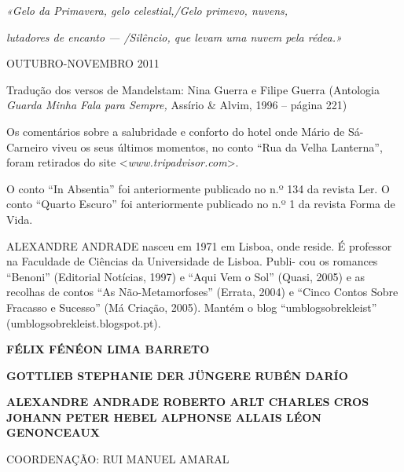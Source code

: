 \emph{«Gelo da Primavera, gelo celestial,/Gelo primevo, nuvens,}

\emph{lutadores de encanto --- /Silêncio, que levam uma nuvem pela
rédea.»}

OUTUBRO-NOVEMBRO 2011

Tradução dos versos de Mandelstam: Nina Guerra e Filipe Guerra
(Antologia \emph{Guarda Minha Fala para Sempre, }Assírio \& Alvim, 1996
-- página 221)

Os comentários sobre a salubridade e conforto do hotel onde Mário de
Sá-Carneiro viveu os seus últimos momentos, no conto ``Rua da Velha
Lanterna'', foram retirados do site \textless{}\emph{www.tripadvisor.com}\textgreater{}.

O conto ``In Absentia'' foi anteriormente publicado no n.º 134 da
revista Ler. O conto ``Quarto Escuro'' foi anteriormente publicado no
n.º 1 da revista Forma de Vida.

ALEXANDRE ANDRADE nasceu em 1971 em Lisboa, onde reside. É professor na
Faculdade de Ciências da Universidade de Lisboa. Publi- cou os romances
``Benoni'' (Editorial Notícias, 1997) e ``Aqui Vem o Sol'' (Quasi, 2005)
e as recolhas de contos ``As Não-Metamorfoses'' (Errata, 2004) e ``Cinco
Contos Sobre Fracasso e Sucesso'' (Má Criação, 2005). Mantém o blog
``umblogsobrekleist'' (umblogsobrekleist.blogspot.pt).

\textbf{FÉLIX FÉNÉON LIMA BARRETO}

\textbf{GOTTLIEB STEPHANIE DER JÜNGERE RUBÉN DARÍO}

\textbf{ALEXANDRE ANDRADE ROBERTO ARLT CHARLES CROS JOHANN PETER HEBEL
ALPHONSE ALLAIS LÉON GENONCEAUX}

COORDENAÇÃO: RUI MANUEL AMARAL
